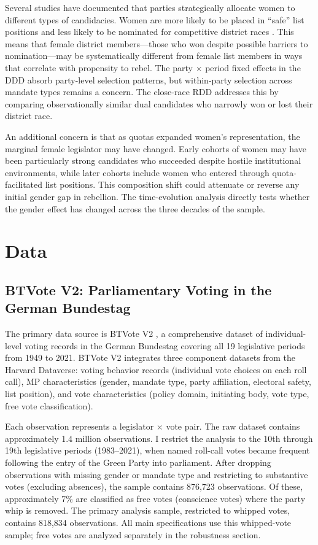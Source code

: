 \documentclass[12pt]{article}
\begin{document}
Several studies have documented that parties strategically allocate women to different types of candidacies. Women are more likely to be placed in ``safe'' list positions and less likely to be nominated for competitive district races \citep{xydias2007}. This means that female district members---those who won despite possible barriers to nomination---may be systematically different from female list members in ways that correlate with propensity to rebel. The party $\times$ period fixed effects in the DDD absorb party-level selection patterns, but within-party selection across mandate types remains a concern. The close-race RDD addresses this by comparing observationally similar dual candidates who narrowly won or lost their district race.

An additional concern is that as quotas expanded women's representation, the marginal female legislator may have changed. Early cohorts of women may have been particularly strong candidates who succeeded despite hostile institutional environments, while later cohorts include women who entered through quota-facilitated list positions. This composition shift could attenuate or reverse any initial gender gap in rebellion. The time-evolution analysis directly tests whether the gender effect has changed across the three decades of the sample.


\section{Data}\label{sec:data}

\subsection{BTVote V2: Parliamentary Voting in the German Bundestag}

The primary data source is BTVote V2 \citep{btvote2023}, a comprehensive dataset of individual-level voting records in the German Bundestag covering all 19 legislative periods from 1949 to 2021. BTVote V2 integrates three component datasets from the Harvard Dataverse: voting behavior records (individual vote choices on each roll call), MP characteristics (gender, mandate type, party affiliation, electoral safety, list position), and vote characteristics (policy domain, initiating body, vote type, free vote classification).

Each observation represents a legislator $\times$ vote pair. The raw dataset contains approximately 1.4 million observations. I restrict the analysis to the 10th through 19th legislative periods (1983--2021), when named roll-call votes became frequent following the entry of the Green Party into parliament. After dropping observations with missing gender or mandate type and restricting to substantive votes (excluding absences), the sample contains 876,723 observations. Of these, approximately 7\% are classified as free votes (conscience votes) where the party whip is removed. The primary analysis sample, restricted to whipped votes, contains 818,834 observations. All main specifications use this whipped-vote sample; free votes are analyzed separately in the robustness section.
\end{document}

